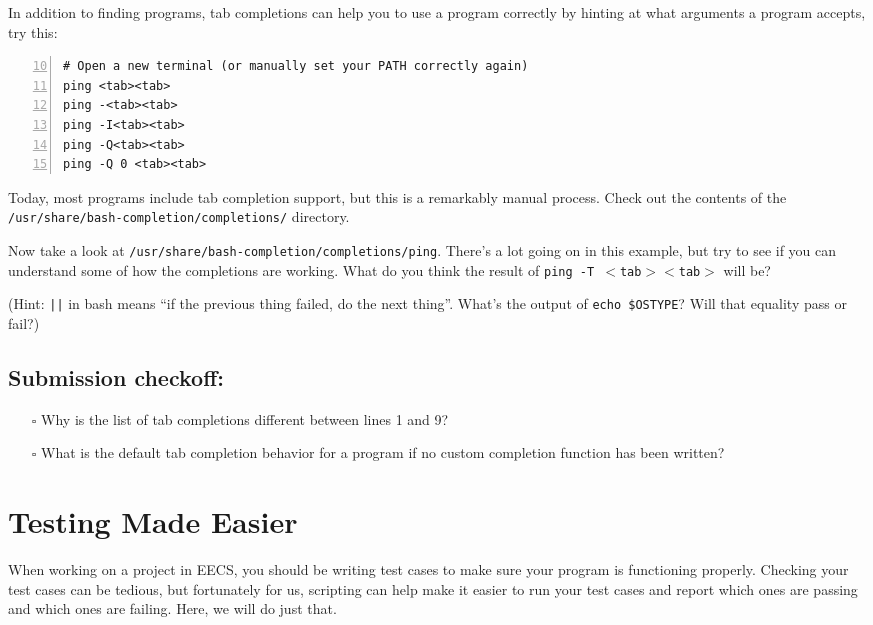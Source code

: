 \documentclass{article}
\begin{document}
\medskip
\noindent
In addition to finding programs, tab completions can help you to use a program
correctly by hinting at what arguments a program accepts, try this:

\begin{lstlisting}[numbers=left,firstnumber=10]
# Open a new terminal (or manually set your PATH correctly again)
ping <tab><tab>
ping -<tab><tab>
ping -I<tab><tab>
ping -Q<tab><tab>
ping -Q 0 <tab><tab>
\end{lstlisting}

\noindent
Today, most programs include tab completion support, but this is a remarkably
manual process. Check out the contents of the
\texttt{/usr/share/bash-completion/completions/} directory.

\medskip
\noindent
Now take a look at \texttt{/usr/share/bash-completion/completions/ping}.
There's a lot going on in this example, but try to see if you can understand
some of how the completions are working. What do you think the result of
\texttt{ping~-T~$<$tab$><$tab$>$} will be?

\medskip
\noindent
(Hint: \texttt{||} in bash means ``if the previous thing failed, do the next
thing''. What's the output of \texttt{echo \$OSTYPE}? Will that equality pass
or fail?)


\subsection*{Submission checkoff:}
\begin{itemize}
  \item[$\square$] Why is the list of tab completions different between lines
    1 and 9?
  \item[$\square$] What is the default tab completion behavior for a program
    if no custom completion function has been written?
\end{itemize}


\pagebreak


\section{Testing Made Easier}

\medskip
\noindent
When working on a project in EECS, you should be writing test cases to make
sure your program is functioning properly. Checking your test cases can be
tedious, but fortunately for us, scripting can help make it easier to run your
test cases and report which ones are passing and which ones are failing. Here,
we will do just that.
\end{document}
